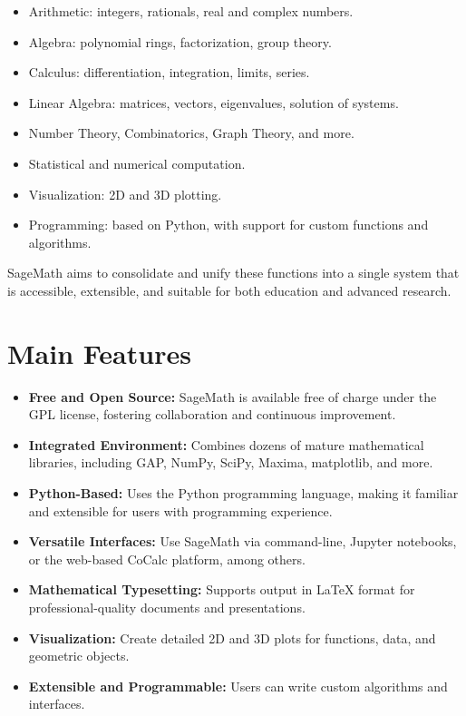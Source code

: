 \documentclass[12pt]{book}
\begin{document}
\begin{itemize}
  \item Arithmetic: integers, rationals, real and complex numbers.
  \item Algebra: polynomial rings, factorization, group theory.
  \item Calculus: differentiation, integration, limits, series.
  \item Linear Algebra: matrices, vectors, eigenvalues, solution of systems.
  \item Number Theory, Combinatorics, Graph Theory, and more.
  \item Statistical and numerical computation.
  \item Visualization: 2D and 3D plotting.
  \item Programming: based on Python, with support for custom functions and algorithms.
\end{itemize}

SageMath aims to consolidate and unify these functions into a single system that is accessible, extensible, and suitable for both education and advanced research.

\section*{Main Features}

\begin{itemize}
  \item \textbf{Free and Open Source:} SageMath is available free of charge under the GPL license, fostering collaboration and continuous improvement.
  \item \textbf{Integrated Environment:} Combines dozens of mature mathematical libraries, including GAP, NumPy, SciPy, Maxima, matplotlib, and more.
  \item \textbf{Python-Based:} Uses the Python programming language, making it familiar and extensible for users with programming experience.
  \item \textbf{Versatile Interfaces:} Use SageMath via command-line, Jupyter notebooks, or the web-based CoCalc platform, among others.
  \item \textbf{Mathematical Typesetting:} Supports output in \LaTeX{} format for professional-quality documents and presentations.
  \item \textbf{Visualization:} Create detailed 2D and 3D plots for functions, data, and geometric objects.
  \item \textbf{Extensible and Programmable:} Users can write custom algorithms and interfaces.
\end{itemize}
\end{document}
